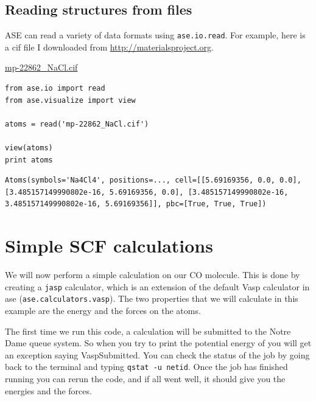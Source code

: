 \documentclass[11pt]{article}
\begin{document}
\subsection{Reading structures from files}
\label{sec-4-3}

ASE can read a variety of data formats using \verb~ase.io.read~. For example, here is a cif file I downloaded from \url{http://materialsproject.org}.

\url{mp-22862_NaCl.cif}

\begin{verbatim}
from ase.io import read
from ase.visualize import view

atoms = read('mp-22862_NaCl.cif')

view(atoms)
print atoms
\end{verbatim}

\begin{verbatim}
Atoms(symbols='Na4Cl4', positions=..., cell=[[5.69169356, 0.0, 0.0], [3.485157149990802e-16, 5.69169356, 0.0], [3.485157149990802e-16, 3.485157149990802e-16, 5.69169356]], pbc=[True, True, True])
\end{verbatim}



\section{Simple SCF calculations}
\label{sec-5}

We will now perform a simple calculation on our CO molecule. This is done by creating a \texttt{jasp} calculator, which is an extension of the default Vasp calculator in ase (\verb~ase.calculators.vasp~). The two properties that we will calculate in this example are the energy and the forces on the atoms. 

The first time we run this code, a calculation will be submitted to the Notre Dame queue system. So when you try to print the potential energy of you will get an exception saying VaspSubmitted. You can check the status of the job by going back to the terminal and typing \verb~qstat -u netid~. Once the job has finished running you can rerun the code, and if all went well, it should give you the energies and the forces.
\end{document}
